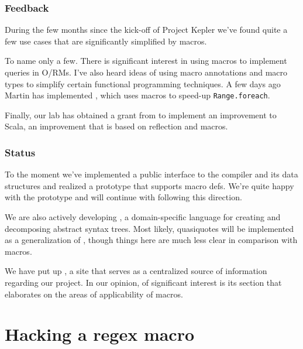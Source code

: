 \documentclass[hyperref={bookmarks=false}]{beamer}
\begin{document}
\begin{frame}[t,fragile]
\frametitle{Feedback}

During the few months since the kick-off of Project Kepler we've found quite a few use cases that are significantly simplified by macros.

To name only a few. There is significant interest in using macros to implement queries in O/RMs. I've also heard ideas of using macro annotations and macro types to simplify certain functional programming techniques. A few days ago Martin has implemented , which uses macros to speed-up \texttt{Range.foreach}.

Finally, our lab has obtained a grant from  to implement an improvement to Scala, an improvement that is based on reflection and macros.
\end{frame}

\begin{frame}[t,fragile]
\frametitle{Status}

To the moment we've implemented a public interface to the compiler and its data structures and realized a prototype that supports macro defs. We're quite happy with the prototype and will continue with following this direction.

We are also actively developing , a domain-specific language for creating and decomposing abstract syntax trees. Most likely, quasiquotes will be implemented as a generalization of , though things here are much less clear in comparison with macros.

We have put up , a site that serves as a centralized source of information regarding our project. In our opinion, of significant interest is its  section that elaborates on the areas of applicability of macros.
\end{frame}

\section{Hacking a regex macro}
\end{document}

